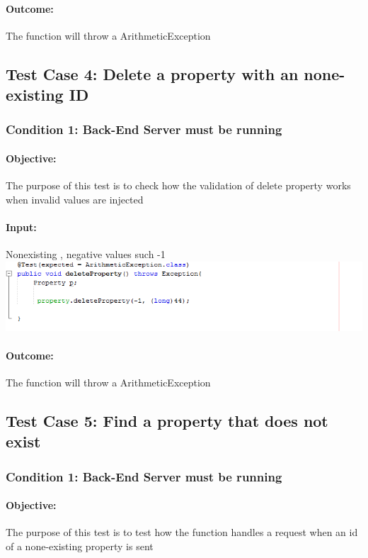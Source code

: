 \documentclass[a4paper,12pt]{article}
\begin{document}
\paragraph{Outcome: } The function will throw a ArithmeticException

\subsection{Test Case 4: Delete a property with an none-existing ID}
\subsubsection{Condition 1: Back-End Server must be running}
\paragraph{Objective:}The purpose of this test is to check how the validation of delete property works when invalid values are injected 
\paragraph{Input:}Nonexisting , negative values such  -1\\
\includegraphics[width=1\textwidth]{./Images/input4.png}

\paragraph{Outcome: } The function will throw a ArithmeticException

\subsection{Test Case 5: Find a property that does not exist}
\subsubsection{Condition 1: Back-End Server must be running}
\paragraph{Objective:}The purpose of this test is to test how the function handles a request when an id of a none-existing property is sent
\end{document}
